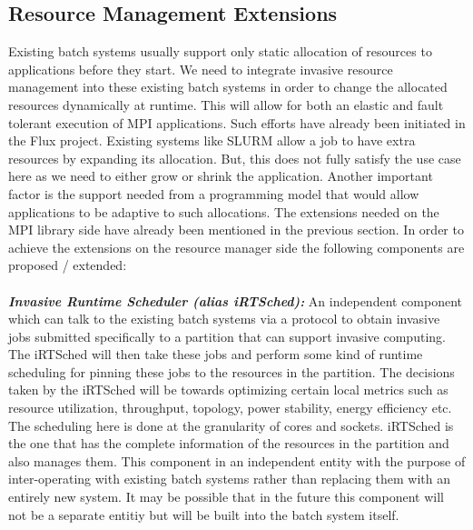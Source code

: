 \subsection{Resource Management Extensions}
Existing batch systems usually support only static allocation of resources to applications before they start. We need to integrate invasive resource management into these existing batch systems in order to change the allocated resources dynamically at runtime. This will allow for both an elastic and fault tolerant execution of MPI applications. Such efforts have already been initiated in the Flux project. Existing systems like SLURM allow a job to have extra resources by expanding its allocation. But, this does not fully satisfy the use case here as we need to either grow or shrink the application. Another important factor is the support needed from a programming model that would allow applications to be adaptive to such allocations. The extensions needed on the MPI library side have already been mentioned in the previous section. In order to achieve the extensions on the resource manager side the following components are proposed / extended:\\ \\
\textbf{\textit{Invasive Runtime Scheduler (alias iRTSched):}} An independent component which can talk to the existing batch systems via a protocol to obtain invasive jobs submitted specifically to a partition that can support invasive computing. The iRTSched will then take these jobs and perform some kind of runtime scheduling for pinning these jobs to the resources in the partition. The decisions taken by the iRTSched will be towards optimizing certain local metrics such as resource utilization, throughput, topology, power stability, energy efficiency etc. The scheduling here is done at the granularity of cores and sockets. iRTSched is the one that has the complete information of the resources in the partition and also manages them. This component in an independent entity with the purpose of inter-operating with existing batch systems rather than replacing them with an entirely new system. It may be possible that in the future this component will not be a separate entitiy but will be built into the batch system itself.\\ \\
